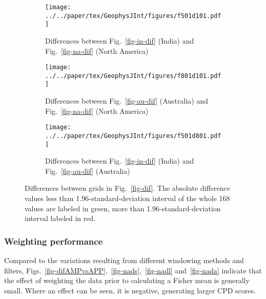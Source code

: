 \begin{figure*}
	\centering
	\begin{subfigure}{1.01\textwidth}
		\texttt{[image: ../../paper/tex/GeophysJInt/figures/f501d101.pdf]}
		\caption{Differences between Fig.~\ref{fig-in-dif} (India) and
		Fig.~\ref{fig-na-dif} (North America)}\label{fig-i-n-dif}
	\end{subfigure}
	\vspace{.1em}
	\begin{subfigure}{1.01\textwidth}
		\texttt{[image: ../../paper/tex/GeophysJInt/figures/f801d101.pdf]}
		\caption{Differences between Fig.~\ref{fig-au-dif} (Australia) and
		Fig.~\ref{fig-na-dif} (North America)}\label{fig-a-n-dif}
	\end{subfigure}
	\vspace{.1em}
	\begin{subfigure}{1.01\textwidth}
		\texttt{[image: ../../paper/tex/GeophysJInt/figures/f501d801.pdf]}
		\caption{Differences between Fig.~\ref{fig-in-dif} (India) and
		Fig.~\ref{fig-au-dif} (Australia)}\label{fig-i-a-dif}
	\end{subfigure}
	\caption[Differences of differences of each plate's paleomagnetic
APWPs versus its FHM predicted APWP]{Differences between grids in
Fig.~\ref{fig-dif}. The absolute difference values less than
1.96-standard-deviation interval of the whole 168 values are labeled in green,
more than 1.96-standard-deviation interval labeled in red.}\label{fig-d-dif}
\end{figure*}

\subsubsection{Weighting performance}

Compared to the variations resulting from different windowing methods and
filters, Figs.~\ref{fig-difAMPvsAPP},~\ref{fig-nads},~\ref{fig-nadl}
and~\ref{fig-nada} indicate that the effect of weighting the data prior to
calculating a Fisher mean is generally small. Where an effect can be seen, it is
negative, generating larger CPD scores.

